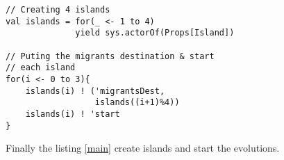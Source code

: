 \begin{lstlisting}[frame=none]
// Creating 4 islands
val islands = for(_ <- 1 to 4)
              yield sys.actorOf(Props[Island])
		
// Puting the migrants destination & start
// each island
for(i <- 0 to 3){
	islands(i) ! ('migrantsDest,
	              islands((i+1)%4))
	islands(i) ! 'start
}
\end{lstlisting}

Finally the listing \ref{main} create islands and start the evolutions.  